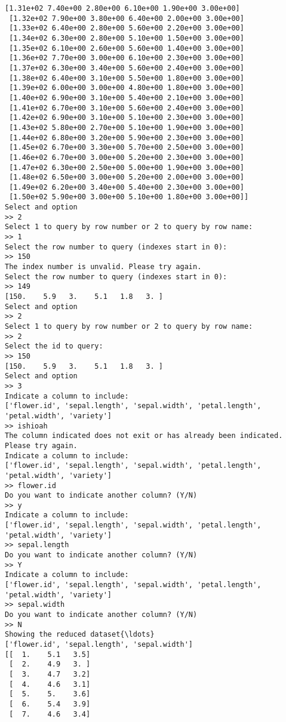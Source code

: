 \documentclass[11pt]{article}
\begin{document}
\begin{Verbatim}[commandchars=\\\{\}]
 [1.31e+02 7.40e+00 2.80e+00 6.10e+00 1.90e+00 3.00e+00]
 [1.32e+02 7.90e+00 3.80e+00 6.40e+00 2.00e+00 3.00e+00]
 [1.33e+02 6.40e+00 2.80e+00 5.60e+00 2.20e+00 3.00e+00]
 [1.34e+02 6.30e+00 2.80e+00 5.10e+00 1.50e+00 3.00e+00]
 [1.35e+02 6.10e+00 2.60e+00 5.60e+00 1.40e+00 3.00e+00]
 [1.36e+02 7.70e+00 3.00e+00 6.10e+00 2.30e+00 3.00e+00]
 [1.37e+02 6.30e+00 3.40e+00 5.60e+00 2.40e+00 3.00e+00]
 [1.38e+02 6.40e+00 3.10e+00 5.50e+00 1.80e+00 3.00e+00]
 [1.39e+02 6.00e+00 3.00e+00 4.80e+00 1.80e+00 3.00e+00]
 [1.40e+02 6.90e+00 3.10e+00 5.40e+00 2.10e+00 3.00e+00]
 [1.41e+02 6.70e+00 3.10e+00 5.60e+00 2.40e+00 3.00e+00]
 [1.42e+02 6.90e+00 3.10e+00 5.10e+00 2.30e+00 3.00e+00]
 [1.43e+02 5.80e+00 2.70e+00 5.10e+00 1.90e+00 3.00e+00]
 [1.44e+02 6.80e+00 3.20e+00 5.90e+00 2.30e+00 3.00e+00]
 [1.45e+02 6.70e+00 3.30e+00 5.70e+00 2.50e+00 3.00e+00]
 [1.46e+02 6.70e+00 3.00e+00 5.20e+00 2.30e+00 3.00e+00]
 [1.47e+02 6.30e+00 2.50e+00 5.00e+00 1.90e+00 3.00e+00]
 [1.48e+02 6.50e+00 3.00e+00 5.20e+00 2.00e+00 3.00e+00]
 [1.49e+02 6.20e+00 3.40e+00 5.40e+00 2.30e+00 3.00e+00]
 [1.50e+02 5.90e+00 3.00e+00 5.10e+00 1.80e+00 3.00e+00]]
Select and option
>> 2
Select 1 to query by row number or 2 to query by row name:
>> 1
Select the row number to query (indexes start in 0):
>> 150
The index number is unvalid. Please try again.
Select the row number to query (indexes start in 0):
>> 149
[150.    5.9   3.    5.1   1.8   3. ]
Select and option
>> 2
Select 1 to query by row number or 2 to query by row name:
>> 2
Select the id to query:
>> 150
[150.    5.9   3.    5.1   1.8   3. ]
Select and option
>> 3
Indicate a column to include:
['flower.id', 'sepal.length', 'sepal.width', 'petal.length', 'petal.width', 'variety']
>> ishioah
The column indicated does not exit or has already been indicated. Please try again.
Indicate a column to include:
['flower.id', 'sepal.length', 'sepal.width', 'petal.length', 'petal.width', 'variety']
>> flower.id
Do you want to indicate another column? (Y/N)
>> y
Indicate a column to include:
['flower.id', 'sepal.length', 'sepal.width', 'petal.length', 'petal.width', 'variety']
>> sepal.length
Do you want to indicate another column? (Y/N)
>> Y
Indicate a column to include:
['flower.id', 'sepal.length', 'sepal.width', 'petal.length', 'petal.width', 'variety']
>> sepal.width
Do you want to indicate another column? (Y/N)
>> N
Showing the reduced dataset{\ldots}
['flower.id', 'sepal.length', 'sepal.width']
[[  1.    5.1   3.5]
 [  2.    4.9   3. ]
 [  3.    4.7   3.2]
 [  4.    4.6   3.1]
 [  5.    5.    3.6]
 [  6.    5.4   3.9]
 [  7.    4.6   3.4]

\end{Verbatim}
\end{document}
